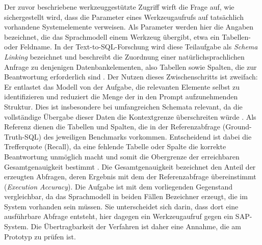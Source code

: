 Der zuvor beschriebene werkzeuggestützte Zugriff wirft die Frage auf, wie sichergestellt wird, dass die Parameter eines Werkzeugaufrufs auf tatsächlich vorhandene Systemelemente verweisen. Als Parameter werden hier die Angaben bezeichnet, die das Sprachmodell einem Werkzeug übergibt, etwa ein Tabellen- oder Feldname. In der Text-to-SQL-Forschung wird diese Teilaufgabe als \emph{Schema Linking} bezeichnet und beschreibt die Zuordnung einer natürlichsprachlichen Anfrage zu denjenigen Datenbankelementen, also Tabellen sowie Spalten, die zur Beantwortung erforderlich sind \cite{katsogiannis-meimarakis_-depth_2026}. Der Nutzen dieses Zwischenschritts ist zweifach: Er entlastet das Modell von der Aufgabe, die relevanten Elemente selbst zu identifizieren und reduziert die Menge der in den Prompt aufzunehmenden Struktur. Dies ist insbesondere bei umfangreichen Schemata relevant, da die vollständige Übergabe dieser Daten die Kontextgrenze überschreiten würde \cite{katsogiannis-meimarakis_-depth_2026}. Als Referenz dienen die Tabellen und Spalten, die in der Referenzabfrage (Ground-Truth-SQL) des jeweiligen Benchmarks vorkommen. Entscheidend ist dabei die Trefferquote (Recall), da eine fehlende Tabelle oder Spalte die korrekte Beantwortung unmöglich macht und somit die Obergrenze der erreichbaren Gesamtgenauigkeit bestimmt \cite{katsogiannis-meimarakis_-depth_2026}. Die Gesamtgenauigkeit bezeichnet den Anteil der erzeugten Abfragen, deren Ergebnis mit dem der Referenzabfrage übereinstimmt (\emph{Execution Accuracy}). %
Die Aufgabe ist mit dem vorliegenden Gegenstand vergleichbar, da das Sprachmodell in beiden Fällen Bezeichner erzeugt, die im System vorhanden sein müssen. Sie unterscheidet sich darin, dass dort eine ausführbare Abfrage entsteht, hier dagegen ein Werkzeugaufruf gegen ein SAP-System. Die Übertragbarkeit der Verfahren ist daher eine Annahme, die am Prototyp zu prüfen ist.
